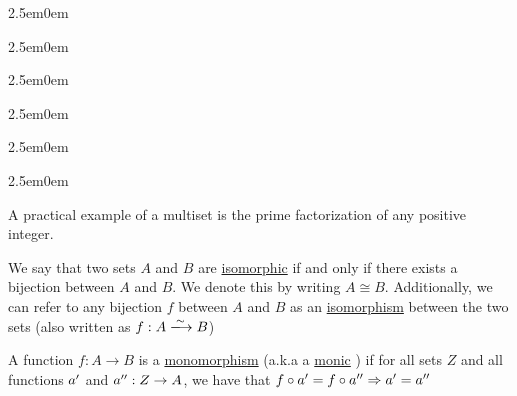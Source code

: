 \documentclass{book}
\newcommand{\hOne}{%
   \color{Black}%
   \fontsize{14}{14}\selectfont%
}
\newcommand{\myComment}{%
   \color{RawerSienna}%
   \fontsize{12}{12}%
}
\newenvironment{myIndent}{%
   \begin{adjustwidth}{2.5em}{0em}%
}{%
   \end{adjustwidth}%
}
\newcommand{\udefine}[1]{%
   \setulcolor{Red}%
   \setul{0.1ex}{0.15ex}%
   \ul{#1}%
}
\newcommand{\pprime}{\prime\prime}
\begin{document}
\begin{myIndent}
\begin{itemize}
      \end{itemize}
   
      \begin{myIndent}\begin{myIndent}\begin{myIndent}
      \begin{myIndent}\begin{myIndent}
         \myComment
         \hfill \break
         A practical example of a multiset is the prime
         factorization of any positive integer.
      \end{myIndent}\end{myIndent}\end{myIndent}
      \end{myIndent}\end{myIndent}
   
   \end{myIndent}

   \hrulefill

   \hOne
   \hfill \break
   We say that two sets $A$ and $B$ are \udefine{isomorphic} if and only
   if there exists a bijection between $A$ and $B$. We denote this by
   writing $A \cong B$. Additionally, we can refer to any bijection $f$
   between $A$ and $B$ as an \udefine{isomorphism} between the two sets
   (also written as \(f: A \xlongrightarrow{\sim} B\))

   \hfill \break
   A function $f: A \rightarrow B$ is a \udefine{monomorphism} (a.k.a 
   a \udefine{monic}) if for all sets $Z$ and all functions $a\sp{\prime}$
   and $a\sp{\pprime}: Z \rightarrow A$, we have that $f \circ a\sp{\prime}
   = f \circ a\sp{\pprime} \Rightarrow a\sp{\prime} = a\sp{\pprime}$
\end{document}
